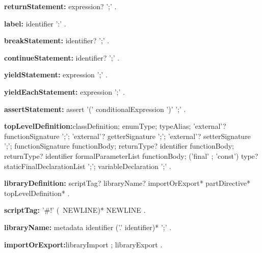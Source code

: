 \begin{grammar}
{\bf returnStatement:}
    \RETURN{} expression? ';' %
    .
 \end{grammar}
\begin{grammar}
{\bf label:}
      identifier ':'
    .
 \end{grammar}
\begin{grammar}
{\bf breakStatement:}
     \BREAK{} identifier? ';'
    .
 \end{grammar}
\begin{grammar}
{\bf continueStatement:}
    \CONTINUE{} identifier? ';'
        .
 \end{grammar}
\begin{grammar}
{\bf yieldStatement:}
   \YIELD{} expression ';'
      .
\end{grammar}
\begin{grammar}
{\bf yieldEachStatement:}
   \YIELD* expression ';'
      .
\end{grammar}
\begin{grammar}
{\bf assertStatement:}
   assert '(' conditionalExpression ')' ';'
      .
\end{grammar}
\begin{grammar}
{\bf topLevelDefinition:}classDefinition;
     enumType;
      typeAlias;
      'external'? functionSignature ';';
      'external'? getterSignature ';';
      'external'? setterSignature ';';      
      functionSignature functionBody;
      returnType? \GET{} identifier functionBody;
      returnType? \SET{} identifier formalParameterList functionBody;
      ('final' ; 'const') type? staticFinalDeclarationList ';';
      variableDeclaration ';'
    .



{\bf libraryDefinition:}
      scriptTag? libraryName? importOrExport* partDirective* topLevelDefinition*
    .
    
    {\bf     scriptTag:}
   '\#!' (~NEWLINE)* NEWLINE
 .    

{\bf libraryName:}
   metadata \LIBRARY{} identifier ('.' identifier)* ';'
   .

{\bf importOrExport:}libraryImport ;
  libraryExport
  .   
 \end{grammar}
